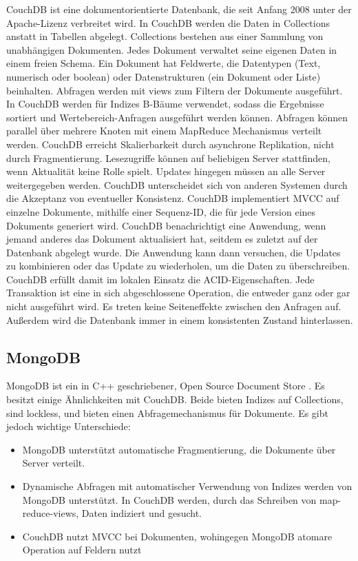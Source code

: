 CouchDB \cite{couch2013} ist eine dokumentorientierte Datenbank, die seit Anfang 2008 unter der  Apache-Lizenz verbreitet wird. In CouchDB werden die Daten in Collections anstatt in Tabellen abgelegt. Collections bestehen aus einer Sammlung von unabhängigen Dokumenten. Jedes Dokument verwaltet seine eigenen Daten in einem freien Schema. 
Ein Dokument hat Feldwerte, die Datentypen (Text, numerisch oder boolean) oder Datenstrukturen (ein Dokument oder Liste) beinhalten. Abfragen werden mit views zum Filtern der Dokumente ausgeführt. In CouchDB werden für Indizes B-Bäume verwendet, sodass die Ergebnisse sortiert und Wertebereich-Anfragen ausgeführt werden können. Abfragen können parallel über mehrere Knoten mit einem MapReduce Mechanismus verteilt werden. CouchDB erreicht Skalierbarkeit durch asynchrone Replikation, nicht durch Fragmentierung. Lesezugriffe können auf beliebigen Server stattfinden, wenn Aktualität keine Rolle spielt. Updates hingegen müssen an alle Server weitergegeben werden.
CouchDB unterscheidet sich von anderen Systemen durch die Akzeptanz von eventueller Konsistenz. CouchDB implementiert MVCC auf einzelne Dokumente, mithilfe einer Sequenz-ID, die für jede Version eines Dokuments generiert wird. CouchDB benachrichtigt eine Anwendung, wenn jemand anderes das Dokument aktualisiert hat, seitdem es zuletzt auf der Datenbank abgelegt wurde. Die Anwendung kann dann versuchen, die Updates zu kombinieren oder das Update zu wiederholen, um die Daten zu überschreiben. CouchDB erfüllt damit im lokalen Einsatz die ACID-Eigenschaften. Jede Transaktion ist eine in sich abgeschlossene Operation, die entweder ganz oder gar nicht ausgeführt wird. Es treten keine Seiteneffekte zwischen den Anfragen auf. Außerdem wird die Datenbank immer in einem konsistenten Zustand hinterlassen.

\subsection{MongoDB}
\label{ch:AnalyseDatenbanken:sec:Datenbanken:subsec:MongoDB}

MongoDB ist ein in C++ geschriebener, Open Source Document Store \cite{books/daglib/0025185}. Es besitzt einige Ähnlichkeiten mit CouchDB. Beide bieten Indizes auf Collections, sind lockless, und bieten einen Abfragemechanismus für Dokumente. Es gibt jedoch wichtige Unterschiede:

\begin{itemize}

	\item MongoDB unterstützt automatische Fragmentierung, die Dokumente über Server verteilt.
	\item Dynamische Abfragen mit automatischer Verwendung von Indizes werden von MongoDB unterstützt. In CouchDB werden, durch das Schreiben von map-reduce-views, Daten indiziert und gesucht.
	\item CouchDB nutzt MVCC bei Dokumenten, wohingegen MongoDB atomare Operation auf Feldern nutzt   

\end{itemize}

